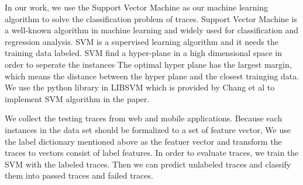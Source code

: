 In our work, we use the Support Vector Machine\cite{SVM} as our machine learning algorithm to solve the classification problem of traces.
Support Vector Machine is a well-known algorithm in machine learning and widely used for classification and regression analysis.
SVM is a supervised learning algorithm and it needs the training data labeled.
SVM find a hyper-plane in a high dimensional space in order to seperate the instances
The optimal hyper plane has the largest margin, which means the distance between the hyper plane and the closest trainging data.
We use the python library in LIBSVM which is provided by Chang et al \cite{LIBSVM} to implement SVM algorithm in the paper.

We collect the testing traces from web and mobile applications.
Because each instances in the data set should be formalized to a set of feature vector,
We use the label dictionary mentioned above as the featuer vector and transform the traces to vectors consist of label features.
In order to evaluate traces, we train the SVM with the labeled traces.
Then we can predict unlabeled traces and classify them into passed traces and failed traces.




